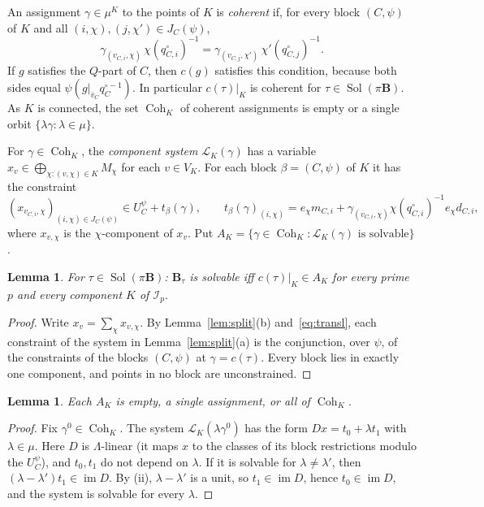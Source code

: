 \documentclass[11pt]{article}
\newtheorem{lemma}[theorem]{Lemma}
\theoremstyle{definition}
\theoremstyle{remark}
\newcommand{\Sol}{\operatorname{Sol}}
\newcommand{\Cohset}{\operatorname{Coh}}
\newcommand{\cL}{\mathcal L}
\begin{document}
An assignment $\gamma\in\mu^{K}$ to the points of $K$ is \emph{coherent} if, for
every block $(C,\psi)$ of $K$ and all $(i,\chi),(j,\chi')\in J_C(\psi)$,
\[
\gamma_{(v_{C,i},\chi)}\,\chi(q^\circ_{C,i})^{-1}=\gamma_{(v_{C,j},\chi')}\,\chi'(q^\circ_{C,j})^{-1}.
\]
If $g$ satisfies the $Q$-part of $C$, then $c(g)$ satisfies this condition,
because both sides equal $\psi(g|_{\bar v_C}q_C^{\circ-1})$. In particular
$c(\tau)|_K$ is coherent for $\tau\in\Sol(\pi\mathbf B)$. As $K$ is connected,
the set $\Cohset_K$ of coherent assignments is empty or a single orbit
$\{\lambda\gamma:\lambda\in\mu\}$.

For $\gamma\in\Cohset_K$, the \emph{component system} $\cL_K(\gamma)$ has a
variable $x_v\in\bigoplus_{\chi:(v,\chi)\in K}M_\chi$ for each $v\in V_K$. For
each block $\beta=(C,\psi)$ of $K$ it has the constraint
\[
(x_{v_{C,i},\chi})_{(i,\chi)\in J_C(\psi)}\in U_C^\psi+t_\beta(\gamma),\qquad
t_\beta(\gamma)_{(i,\chi)}=e_\chi m_{C,i}+\gamma_{(v_{C,i},\chi)}\chi(q^\circ_{C,i})^{-1}e_\chi d_{C,i},
\]
where $x_{v,\chi}$ is the $\chi$-component of $x_v$. Put
$A_K=\{\gamma\in\Cohset_K:\cL_K(\gamma)\text{ is solvable}\}$.

\begin{lemma}\label{lem:decomp}
For $\tau\in\Sol(\pi\mathbf B)$: $\mathbf B_\tau$ is solvable iff
$c(\tau)|_K\in A_K$ for every prime $p$ and every component $K$ of
$\mathcal I_p$.
\end{lemma}
\begin{proof}
Write $x_v=\sum_\chi x_{v,\chi}$. By Lemma~\ref{lem:split}(b)
and~\eqref{eq:transl}, each constraint of the system in
Lemma~\ref{lem:split}(a) is the conjunction, over $\psi$, of the constraints of
the blocks $(C,\psi)$ at $\gamma=c(\tau)$. Every block lies in exactly one
component, and points in no block are unconstrained.
\end{proof}

\begin{lemma}\label{lem:dichotomy}
Each $A_K$ is empty, a single assignment, or all of $\Cohset_K$.
\end{lemma}
\begin{proof}
Fix $\gamma^0\in\Cohset_K$. The system $\cL_K(\lambda\gamma^0)$ has the form
$Dx=t_0+\lambda t_1$ with $\lambda\in\mu$. Here $D$ is $\Lambda$-linear (it maps
$x$ to the classes of its block restrictions modulo the $U_C^\psi$), and $t_0,t_1$
do not depend on $\lambda$. If it is solvable for $\lambda\ne\lambda'$, then
$(\lambda-\lambda')t_1\in\operatorname{im}D$. By (ii), $\lambda-\lambda'$ is a
unit, so $t_1\in\operatorname{im}D$, hence $t_0\in\operatorname{im}D$, and the
system is solvable for every $\lambda$.
\end{proof}
\end{document}
